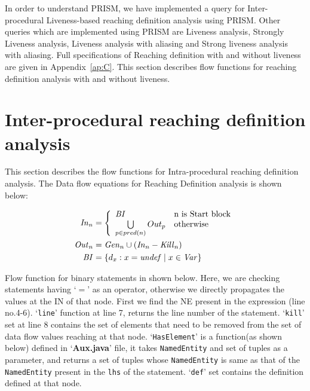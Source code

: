 \documentclass[11pt,a4paper,openright]{report}
\begin{document}
In order to understand PRISM, we have implemented a query for Inter-procedural Liveness-based reaching definition analysis using PRISM. Other queries which are 
implemented using PRISM are Liveness analysis, Strongly Liveness analysis, Liveness analysis with aliasing and Strong liveness analysis with aliasing.
Full specifications of Reaching definition with and without liveness are given in Appendix~\ref{ap:C}. This section describes flow functions for reaching definition analysis with and without
liveness.

\section{Inter-procedural reaching definition analysis}
This section describes the flow functions for Intra-procedural reaching definition analysis.
The Data flow equations for Reaching Definition analysis is shown below:

\begin{equation}
\begin{split}
\mbox{\textit{In}}_n &= \left\{ \begin{array}{ll}
	  \mbox{\textit{BI}} & \mbox{n is Start block}\\
	  \bigcup\limits_{p \in pred(n)} Out_p & \mbox{otherwise}
	  \end{array} \right.\\ 
\mbox{\textit{Out}}_n &= \mbox{\textit{Gen}}_n \cup (\mbox{\textit{In}}_n - \mbox{\textit{Kill}}_n) \\
\mbox{\textit{BI}} &= \{d_x : x = \mbox{\textit{undef}} \mid x \in \mbox{\textit{Var}}\} \\
\end{split} 
\end{equation}
  
Flow function for binary statements in shown below. Here, we are checking statements having `$=$' as an operator, otherwise we  
directly propagates the values at the IN of that node. First we find the NE present in the expression (line no.4-6). `\texttt{line}'
 function at line 7, returns the line number of the statement. `\texttt{kill}' set at line 8 contains the set of elements that need 
 to be removed from the set of data flow values reaching at that node. `\texttt{HasElement}' is a function(as shown below) defined in
`\textbf{Aux.java}' file, it takes \texttt{NamedEntity} and set of tuples as a parameter, and returns a set of tuples whose \texttt{NamedEntity} is same
as that of the \texttt{NamedEntity} present in the \texttt{lhs} of the statement. `\texttt{def}' set contains the definition defined at that node.
\end{document}
